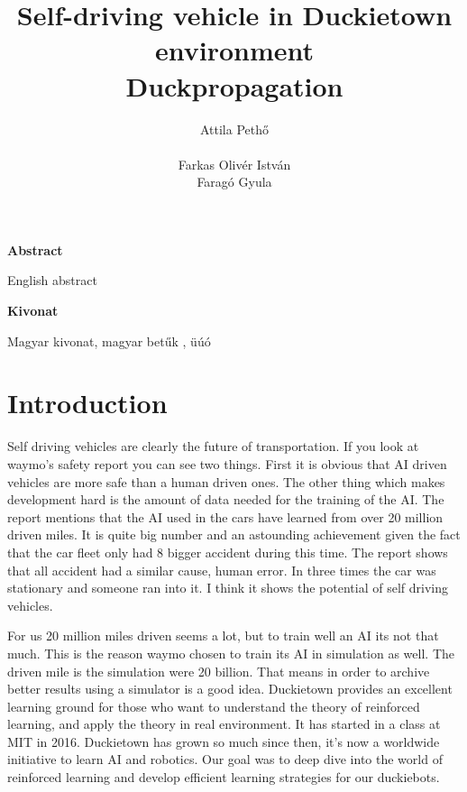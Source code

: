 \documentclass{article}
\title{Self-driving vehicle in Duckietown environment\\
	\large Duckpropagation }
\author{
  Attila Pethő\\\\
   \And  
   Farkas Olivér István \\
   \And
    Faragó Gyula\\
}
\begin{document}

\maketitle



\begin{center}
	\large
	\textbf{Abstract}\\
\end{center}
English abstract

\begin{center}
	\large
	\textbf{Kivonat}\\
\end{center}

Magyar kivonat, magyar betűk , üúó

\section{\large{Introduction}}

Self driving vehicles are clearly the future of transportation. If you look at waymo's \cite{waymo}  safety report you can see two things. First it is obvious that AI driven vehicles are more safe than a human driven ones. The other thing which makes development hard is the amount of data needed for the training of the AI. 
The report mentions that the AI used in the cars have learned from over 20 million driven miles. It is quite big number and an astounding achievement given the fact that the car fleet only had 8 bigger accident during this time. The report shows that all accident had a similar cause, human error. In three times the car was stationary and someone ran into it. I think it shows the potential of self driving vehicles.

For us 20 million miles driven seems a lot, but to train well an AI its not that much. This is the reason waymo chosen to train its AI in simulation as well. The driven mile is the simulation were 20 billion. That means in order to archive better results using a simulator is a good idea. Duckietown provides an excellent learning ground for those who want to understand the theory of reinforced learning, and apply the theory in real environment. 
It has started in a class at MIT in 2016. Duckietown has grown so much since then, it's now a worldwide initiative to learn AI and robotics. Our goal was to deep dive into the world of reinforced learning and develop efficient learning strategies for our duckiebots.
\end{document}
